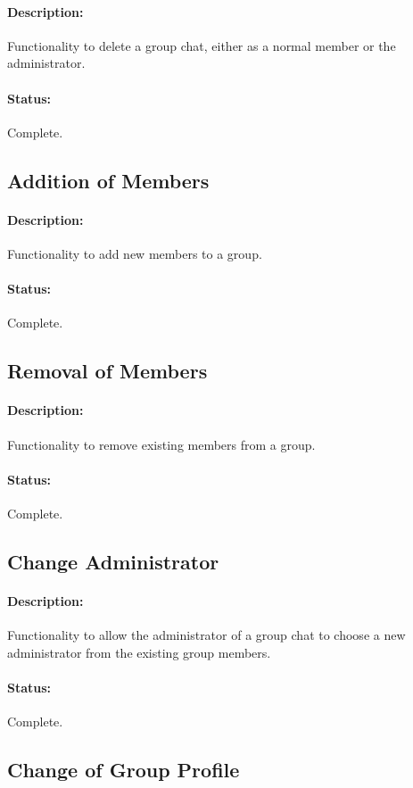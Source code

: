 \documentclass[11pt]{article}
\begin{document}
\paragraph{Description:} Functionality to delete a group chat, either as a normal member or the administrator.
\paragraph{Status:} Complete.

\subsection{Addition of Members}
\paragraph{Description:} Functionality to add new members to a group.
\paragraph{Status:} Complete.

\subsection{Removal of Members}
\paragraph{Description:} Functionality to remove existing members from a group.
\paragraph{Status:} Complete.

\subsection{Change Administrator}
\paragraph{Description:} Functionality to allow the administrator of a group chat to choose a new administrator from the existing group members.
\paragraph{Status:} Complete.

\subsection{Change of Group Profile}
\end{document}
